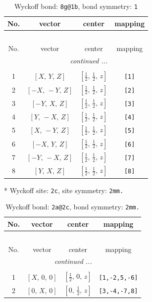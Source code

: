 \documentclass[fleqn,8pt]{jsarticle}
\begin{document}
\begin{longtable}{cccc}
\caption{Wyckoff bond: {\tt 8g@1b}, bond symmetry: {\tt 1}}
 \\
 \hline \hline
No. & vector & center & mapping \\ \hline \endfirsthead

\multicolumn{3}{l}{\tablename\ \thetable{}} \\
 \hline \hline
No. & vector & center & mapping \\ \hline \endhead

 \hline \hline
\multicolumn{3}{r}{\footnotesize\it continued ...} \\ \endfoot

 \hline \hline
\multicolumn{3}{r}{} \\ \endlastfoot

1 & $\left[ X,\, Y,\, Z \right]$ & $\left[ \frac{1}{2},\, \frac{1}{2},\, z \right]$ & {\tt [1]} \\ \hline
2 & $\left[ - X,\, - Y,\, Z \right]$ & $\left[ \frac{1}{2},\, \frac{1}{2},\, z \right]$ & {\tt [2]} \\ \hline
3 & $\left[ - Y,\, X,\, Z \right]$ & $\left[ \frac{1}{2},\, \frac{1}{2},\, z \right]$ & {\tt [3]} \\ \hline
4 & $\left[ Y,\, - X,\, Z \right]$ & $\left[ \frac{1}{2},\, \frac{1}{2},\, z \right]$ & {\tt [4]} \\ \hline
5 & $\left[ X,\, - Y,\, Z \right]$ & $\left[ \frac{1}{2},\, \frac{1}{2},\, z \right]$ & {\tt [5]} \\ \hline
6 & $\left[ - X,\, Y,\, Z \right]$ & $\left[ \frac{1}{2},\, \frac{1}{2},\, z \right]$ & {\tt [6]} \\ \hline
7 & $\left[ - Y,\, - X,\, Z \right]$ & $\left[ \frac{1}{2},\, \frac{1}{2},\, z \right]$ & {\tt [7]} \\ \hline
8 & $\left[ Y,\, X,\, Z \right]$ & $\left[ \frac{1}{2},\, \frac{1}{2},\, z \right]$ & {\tt [8]} \\
\end{longtable}
* Wyckoff site: {\tt 2c}, site symmetry: {\tt 2mm.}
\renewcommand{\arraystretch}{1.2}
\begin{longtable}{cccc}
\caption{Wyckoff bond: {\tt 2a@2c}, bond symmetry: {\tt 2mm.}}
 \\
 \hline \hline
No. & vector & center & mapping \\ \hline \endfirsthead

\multicolumn{3}{l}{\tablename\ \thetable{}} \\
 \hline \hline
No. & vector & center & mapping \\ \hline \endhead

 \hline \hline
\multicolumn{3}{r}{\footnotesize\it continued ...} \\ \endfoot

 \hline \hline
\multicolumn{3}{r}{} \\ \endlastfoot

1 & $\left[ X,\, 0,\, 0 \right]$ & $\left[ \frac{1}{2},\, 0,\, z \right]$ & {\tt [1,-2,5,-6]} \\ \hline
2 & $\left[ 0,\, X,\, 0 \right]$ & $\left[ 0,\, \frac{1}{2},\, z \right]$ & {\tt [3,-4,-7,8]} \\
\end{longtable}
\end{document}
